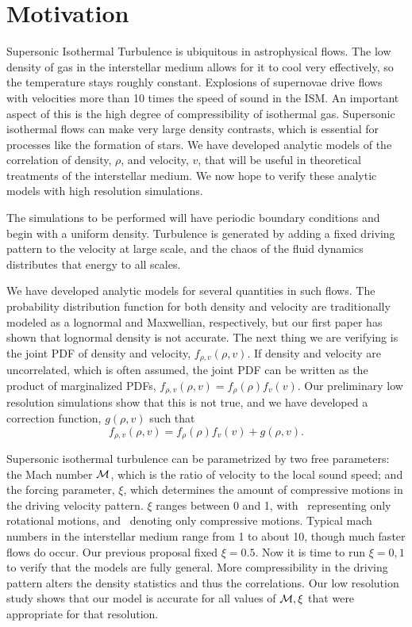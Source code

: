 \section{Motivation}

Supersonic Isothermal Turbulence is ubiquitous in astrophysical flows.  The low
density of gas in the interstellar medium allows for it to cool very
effectively, so the temperature stays roughly constant. Explosions of supernovae
drive flows with velocities more than 10 times the speed of sound in the ISM.
An important aspect of this is the high degree of compressibility of isothermal
gas.  Supersonic isothermal flows can make very large density contrasts, which
is essential for processes like the formation of stars.  We have developed
analytic models of the correlation of density, $\rho$, and velocity, $v$, that
will be useful in theoretical treatments of the interstellar medium.  We now
hope to verify these analytic models with high resolution simulations.  

The simulations to be performed will have periodic boundary conditions and begin
with a uniform density.  Turbulence is generated by adding a fixed driving
pattern to the velocity
 at large scale, and the chaos of the fluid
dynamics distributes that energy to all scales.  

We have developed analytic models for several quantities in such flows.  The
probability distribution function for both density and velocity are
traditionally modeled as a lognormal and Maxwellian, respectively, but our first
paper has shown that lognormal density is not accurate.  The next thing we are
verifying is the joint PDF of density and velocity, $f_{\rho,v}(\rho,v)$.  If
density and velocity are uncorrelated, which is often assumed, the joint PDF can be written as the
product of marginalized PDFs, $f_{\rho,v}(\rho,v)=f_\rho(\rho) f_v(v)$.  Our
preliminary low resolution simulations show that this is not true, and we have
developed a correction function, $g(\rho,v)$ such that 
$$
f_{\rho,v}(\rho,v)=f_\rho(\rho) f_v(v) + g(\rho,v).
$$

Supersonic isothermal turbulence can be parametrized by two free parameters: the
Mach number $\mathcal{M}$, which is the
ratio of velocity to the local sound speed; and the forcing parameter, $\xi$,
which determines the amount of compressive motions in the driving velocity
pattern.
$\xi$ ranges between 0 and 1, with \xis\ representing only rotational motions,
and \xic\ denoting only compressive motions.  Typical mach numbers in the
interstellar medium range from 1
to about 10, though much faster flows do occur.  Our previous proposal fixed
$\xi=0.5$.  Now it is time to run $\xi=0,1$ to verify that the models are fully
general.  More compressibility in the driving pattern alters the density statistics and
thus the correlations.  Our low resolution study shows that our model is
accurate for all values of $\mathcal{M},\xi$ that were appropriate for that
resolution.


